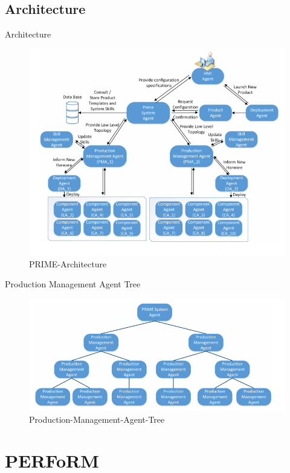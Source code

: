 \documentclass[12pt, xcolor=dvipsnames]{beamer}
\begin{document}
\subsection{Architecture}
\begin{frame}{Architecture}
	\begin{figure}
		\includegraphics[scale=0.435]{PRIME/PRIME-Architecture}
		\caption{PRIME-Architecture \cite{Hybrid}}
	\end{figure}
\end{frame}

\begin{frame}{Production Management Agent Tree}
	\begin{figure}
		\includegraphics[scale=0.385]{PRIME/Production-Management-Agent-Tree}
		\caption{Production-Management-Agent-Tree \cite{Hybrid}}
	\end{figure}
\end{frame}

\section{PERFoRM}
\end{document}
